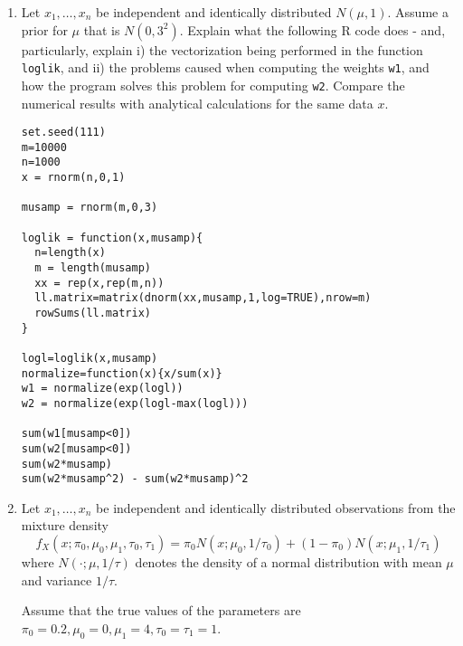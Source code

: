 \documentclass[12pt]{article}
\begin{document}
\begin{enumerate}
\item Let $x_1,\dots,x_n$ be independent and identically distributed $N(\mu,1)$. 
Assume a prior for $\mu$ that is $N(0,3^2)$.
Explain what the following R code does - and, particularly, explain i) the vectorization being performed in the function {\tt loglik},
and ii) the problems caused when computing the weights {\tt w1}, and how the program solves this problem for computing {\tt w2}.
Compare the numerical results with analytical calculations
for the same data $x$.
\begin{verbatim}
set.seed(111)
m=10000
n=1000
x = rnorm(n,0,1)

musamp = rnorm(m,0,3)

loglik = function(x,musamp){
  n=length(x)
  m = length(musamp)
  xx = rep(x,rep(m,n))
  ll.matrix=matrix(dnorm(xx,musamp,1,log=TRUE),nrow=m)
  rowSums(ll.matrix)
}

logl=loglik(x,musamp)
normalize=function(x){x/sum(x)}
w1 = normalize(exp(logl))
w2 = normalize(exp(logl-max(logl)))

sum(w1[musamp<0])
sum(w2[musamp<0])
sum(w2*musamp)
sum(w2*musamp^2) - sum(w2*musamp)^2
\end{verbatim}



\item Let $x_1,\dots,x_n$ be independent and identically distributed observations from the mixture
density
\begin{equation} \label{eqn:mix}
f_X(x; \pi_0, \mu_0,\mu_1,\tau_0,\tau_1) = \pi_0 N(x; \mu_0, 1/\tau_0) + (1-\pi_0) N(x; \mu_1,1/\tau_1)
\end{equation}
where $N(\cdot; \mu,1/\tau)$ denotes the density of a normal distribution with mean $\mu$ and variance $1/\tau$. 

Assume that the true values of the parameters are $\pi_0= 0.2, \mu_0 = 0, \mu_1 = 4, \tau_0=\tau_1=1$. 


\end{enumerate}
\end{document}
